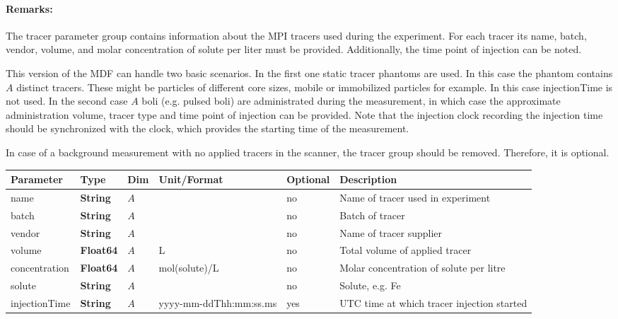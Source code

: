 \documentclass[landscape,a4paper]{article} %
\newcommand{\inltab}[1]{{\ttfamily\bfseries\color{blue}#1}}
\newcommand{\inlvar}[1]{{\ttfamily#1}}
\begin{document}
\begin{multicols}{2}
\paragraph{Remarks:} The tracer parameter group contains information about the MPI tracers used during the experiment. For each tracer its \inlvar{name}, \inlvar{batch}, \inlvar{vendor}, \inlvar{volume},  and molar \inlvar{concentration} of \inlvar{solute} per liter must be provided. Additionally, the time point of injection can be noted.

This version of the MDF can handle two basic scenarios. In the first one static tracer phantoms are used. In this case the phantom contains $A$ distinct tracers. These might be particles of different core sizes, mobile or immobilized particles for example. In this case \inlvar{injectionTime} is not used. In the second case $A$ boli (e.g. pulsed boli) are administrated during the measurement, in which case the approximate administration volume, tracer type and time point of injection can be provided. Note that the injection clock recording the injection time should be synchronized with the clock, which provides the starting time of the measurement.

In case of a background measurement with no applied tracers in the scanner, the tracer group should be removed. Therefore, it is optional.
\end{multicols}

\noindent \begin{tabularx}{\columnwidth}{lllllX} 
\textbf{Parameter} & \textbf{Type} & \textbf{Dim} & \textbf{Unit/Format} & \textbf{Optional} & \textbf{Description} \\ \hline 
\inlvar{name} & \inltab{String} & $A$ & & no & Name of tracer used in experiment \\ \hline
\inlvar{batch} & \inltab{String} & $A$ & & no & Batch of tracer \\ \hline
\inlvar{vendor} & \inltab{String} & $A$ & & no & Name of tracer supplier \\ \hline
\inlvar{volume} & \inltab{Float64} & $A$ & L & no & Total volume of applied tracer \\ \hline
\inlvar{concentration} & \inltab{Float64} & $A$ & mol(solute)/L & no & Molar concentration of solute per litre \\ \hline
\inlvar{solute} & \inltab{String} & $A$ & & no & Solute, e.g. Fe \\ \hline
\inlvar{injectionTime} & \inltab{String} & $A$ & yyyy-mm-ddThh:mm:ss.ms & yes & UTC time at which tracer injection started \\ \hline
\end{tabularx}
\end{document}
